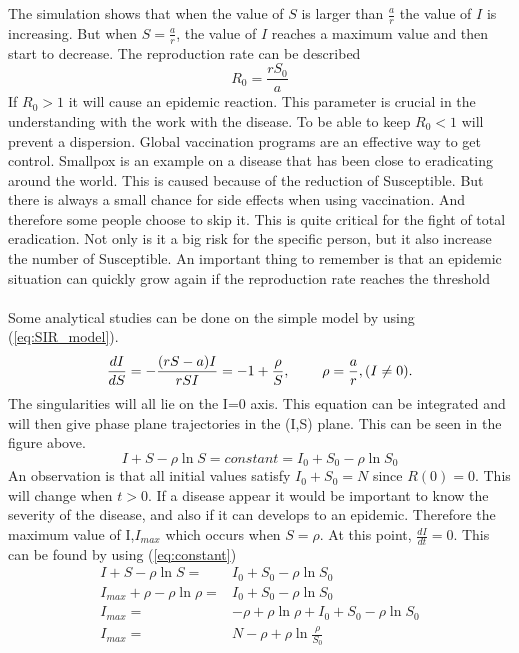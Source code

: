 \documentclass[%
twoside,                 %
final,                   %
10pt]{article}
\begin{document}
The simulation shows that when the value of $S$ is larger than $\frac{a}{r}$ the value of $I$ is increasing. But when $S = \frac{a}{r}$, the value of $I$ reaches a maximum value and then start to decrease. The reproduction rate can be described
\begin{equation}
R_0 = \frac{rS_0}{a}
\end{equation}
If $R_0 > 1$ it will cause an epidemic reaction. This parameter is crucial in the understanding with the work with the disease. To be able to keep $R_0 < 1$ will prevent a dispersion. Global vaccination programs are an effective way to get control. Smallpox is an example on a disease that has been close to eradicating around the world. This is caused because of the reduction of Susceptible. But there is always a small chance for side effects when using vaccination. And therefore some people choose to skip it. This is quite critical for the fight of total eradication. Not only is it a big risk for the specific person, but it also increase the number of Susceptible. An important thing to remember is that an epidemic situation can quickly grow again if the reproduction rate reaches the threshold
\\
\\
Some analytical studies can be done on the simple model by using (\ref{eq:SIR_model}).
\begin{equation} 
\frac{dI}{dS} = -\frac{(rS-a)I}{rSI} = -1 + \frac{\rho}{S},\hspace{8mm}\rho=\frac{a}{r}, (I\neq0).
\end{equation}
The singularities will all lie on the I=0 axis. This equation can be integrated and will then give phase plane trajectories in the (I,S) plane. This can be seen in the figure above.
\begin{equation} \label{eq:constant}
I+S-\rho \ln S = constant = I_0 + S_0 - \rho \ln S_0
\end{equation}
An observation is that all initial values satisfy $I_0+S_0=N$ since $R(0) = 0$. This will change when $t>0$. If a disease appear it would be important to know the severity of the disease, and also if it can develops to an epidemic. Therefore the maximum value of I,$I_{max}$ which occurs when $S=\rho$. At this point, $\frac{dI}{dt}=0$. This can be found by using (\ref{eq:constant})
\begin{align*} \label{eq:max_I}
I+S-\rho \ln S =& I_0 + S_0 - \rho \ln S_0\\
I_{max}+\rho-\rho \ln \rho =& I_0 + S_0 - \rho \ln S_0\\
I_{max}=&- \rho+\rho \ln \rho + I_0 + S_0 - \rho \ln S_0\\
I_{max}=&N - \rho + \rho \ln\frac{\rho}{S_0}\\
\end{align*}
\end{document}
